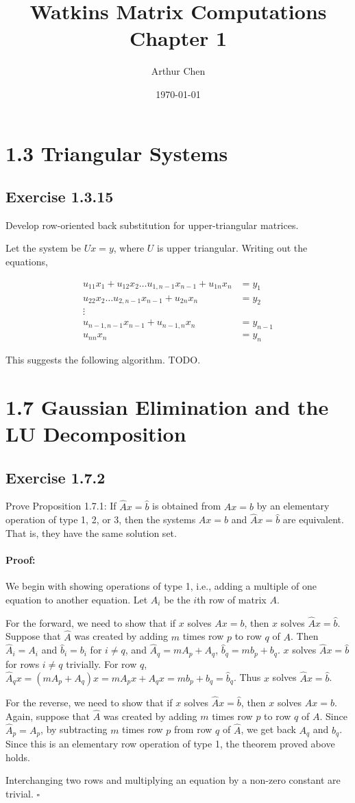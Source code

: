 \documentclass{article}
\author{Arthur Chen}
\title{Watkins Matrix Computations Chapter 1}
\date{\today}
\newenvironment{proof}{\paragraph{Proof:}}{\hfill$\square$}
\begin{document}
\section*{1.3 Triangular Systems}

\subsection*{Exercise 1.3.15}

Develop row-oriented back substitution for upper-triangular matrices.

Let the system be $Ux = y$, where $U$ is upper triangular. Writing out the equations,

\begin{align*}
u_{11}x_1 + u_{12}x_2 \dots u_{1,n-1}x_{n-1} + u_{1n}x_n &= y_1 \\ 
u_{22}x_2 \dots u_{2,n-1}x_{n-1} + u_{2n}x_n &= y_2 \\
\vdots \\
u_{n-1,n-1}x_{n-1} + u_{n-1,n}x_n &= y_{n-1} \\
u_{nn}x_n &= y_n
\end{align*}

This suggests the following algorithm.
TODO.

\section*{1.7 Gaussian Elimination and the LU Decomposition}

\subsection*{Exercise 1.7.2}

Prove Proposition 1.7.1: If $\hat{A}x=\hat{b}$ is obtained from $Ax = b$ by an elementary operation of type 1, 2, or 3, then the systems $Ax = b$ and $\hat{A}x=\hat{b}$ are equivalent. That is, they have the same solution set.

\begin{proof}
We begin with showing operations of type 1, i.e., adding a multiple of one equation to another equation. Let $A_i$ be the $i$th row of matrix $A$.

For the forward, we need to show that if $x$ solves $Ax = b$, then $x$ solves $\hat{A}x = \hat{b}$. Suppose that $\hat{A}$ was created by adding $m$ times row $p$ to row $q$ of $A$. Then $\hat{A}_i = A_i$ and $\hat{b}_i = b_i$ for $i \neq q$, and $\hat{A}_q = mA_p + A_q$, $\hat{b}_q = mb_p + b_q$. $x$ solves $\hat{A}x = \hat{b}$ for rows $i \neq q$ trivially. For row $q$, $\hat{A}_q x = (mA_p + A_q) x = mA_p x + A_q x = mb_p + b_q = \hat{b}_q$. Thus $x$ solves $\hat{A}x = \hat{b}$.

For the reverse, we need to show that if $x$ solves $\hat{A}x = \hat{b}$, then $x$ solves $Ax = b$. Again, suppose that $\hat{A}$ was created by adding $m$ times row $p$ to row $q$ of $A$. Since $\hat{A}_p = A_p$, by subtracting $m$ times row $p$ from row $q$ of $\hat{A}$, we get back $A_q$ and $b_q$. Since this is an elementary row operation of type 1, the theorem proved above holds.

Interchanging two rows and multiplying an equation by a non-zero constant are trivial.
\end{proof}
\end{document}

